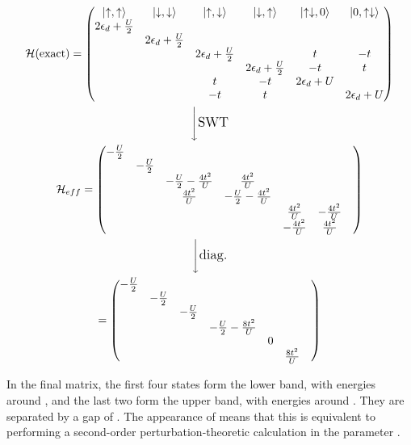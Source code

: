 \documentclass[12pt]{article}
\begin{document}
\begin{gather}
	\mathcal{H}(\text{exact}) = \begin{pmatrix}\ket{\uparrow,\uparrow} &\ket{\downarrow,\downarrow} &\ket{\uparrow,\downarrow} & \ket{\downarrow,\uparrow} &\ket{\uparrow\downarrow,0} &\ket{0,\uparrow\downarrow} \\ 
	2\epsilon_d+\frac{U}{2} &&&&& \\
	& 2\epsilon_d+\frac{U}{2} &&&&\\
	&& 2\epsilon_d+\frac{U}{2} && t & -t \\ 
	&&& 2\epsilon_d+\frac{U}{2} & -t & t \\
	&& t & -t & 2\epsilon_d+U & \\
	&& -t & t && 2\epsilon_d+U 
	\end{pmatrix}\\
	\Bigg\downarrow {\large{\text{SWT}}}\\
	\mathcal{H}_{eff} = \begin{pmatrix} 
	-\frac{U}{2} &&&&& \\ 
	& -\frac{U}{2} &&&&\\
	&& -\frac{U}{2} -\frac{4t^2}{U} & \frac{4t^2}{U} &&& \\ 
	&& \frac{4t^2}{U} & -\frac{U}{2}-\frac{4t^2}{U} &&& \\
	&&&& \frac{4t^2}{U} & -\frac{4t^2}{U} \\
	&&&& -\frac{4t^2}{U} & \frac{4t^2}{U}
	\end{pmatrix}\\
	\Bigg\downarrow {\large{\text{diag.}}}\\ 
	 = \begin{pmatrix}-\frac{U}{2} &&&&& \\ 
	 & -\frac{U}{2} &&&&\\
	 && -\frac{U}{2} &&&& \\ 
	 &&& -\frac{U}{2}-\frac{8t^2}{U} &&& \\
	 &&&& 0 & \\
	 &&&&& \frac{8t^2}{U}
	 \end{pmatrix}
\end{gather}

In the final matrix, the first four states form the lower band, with energies around , and the last two form the upper band, with energies around . They are separated by a gap of . The appearance of  means that this is equivalent to performing a second-order perturbation-theoretic calculation in the parameter .
\end{document}
